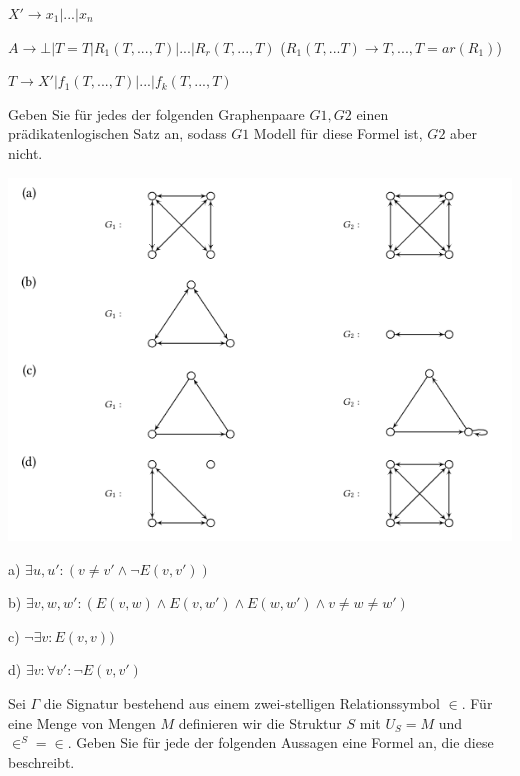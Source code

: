 \documentclass[10pt, a4paper]{exam}
\begin{document}
\begin{questions}
\begin{solution}
        $X'\rightarrow x_1 | ... | x_n$

        $A\rightarrow \bot | T=T | R_1(T,...,T) | ... | R_r(T,...,T)$ ($R_1(T,...T) \rightarrow T,...,T = ar(R_1)$)

        $T\rightarrow X' | f_1(T,...,T) | ... | f_k(T,...,T)$
    \end{solution}

    \question Geben Sie für jedes der folgenden Graphenpaare $G1,G2$ einen prädikatenlogischen Satz an, sodass $G1$ Modell für diese Formel ist, $G2$ aber nicht.
    \begin{center}
        \includegraphics[width=.5\linewidth]{Assets/Logik-uebung6.png}
    \end{center}
    \begin{solution}

        a) $\exists u,u': (v\not=v' \wedge \lnot E(v,v'))$

        b) $\exists v,w,w': (E(v,w) \wedge E(v,w') \wedge E(w,w') \wedge v\not=w\not=w')$

        c) $\lnot\exists v: E(v,v))$

        d) $\exists v: \forall v': \lnot E(v,v')$
    \end{solution}

    \question Sei $\Gamma$ die Signatur bestehend aus einem zwei-stelligen Relationssymbol $\in$. Für eine Menge von Mengen $M$ definieren wir die Struktur $S$ mit $U_S=M$ und $\in^S=\in$. Geben Sie für jede der folgenden Aussagen eine Formel an, die diese beschreibt.
\end{questions}
\end{document}
